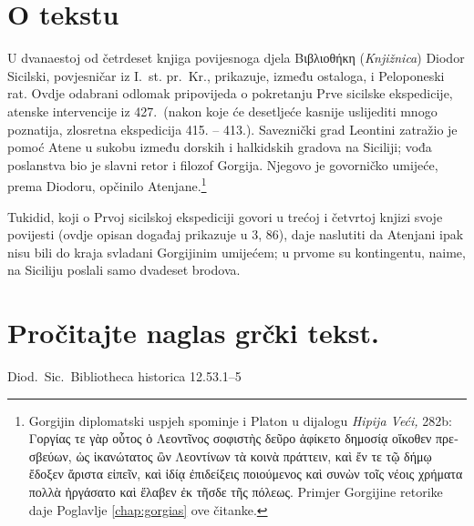 

\section*{O tekstu}

U dvanaestoj od četrdeset knjiga povijesnoga djela \textgreek{Βιβλιοθήκη} (\textit{Knjižnica}) Diodor Sicilski, povjesničar iz I.~st. pr.~Kr., prikazuje, između ostaloga, i Peloponeski rat. Ovdje odabrani odlomak pripovijeda o pokretanju Prve sicilske ekspedicije, atenske intervencije iz 427.\ (nakon koje će desetljeće kasnije uslijediti mnogo poznatija, zlosretna ekspedicija 415. – 413.). Saveznički grad Leontini zatražio je pomoć Atene u sukobu između dorskih i halkidskih gradova na Siciliji; vođa poslanstva bio je slavni retor i filozof Gorgija. Njegovo je govorničko umijeće, prema Diodoru, opčinilo Atenjane.\footnote{Gorgijin diplomatski uspjeh spominje i Platon u dijalogu \textit{Hipija Veći,} 282b: \textgreek{Γοργίας τε γὰρ οὗτος ὁ Λεοντῖνος σοφιστὴς δεῦρο ἀφίκετο δημοσίᾳ οἴκοθεν πρεσβεύων, ὡς ἱκανώτατος ὢν Λεοντίνων τὰ κοινὰ πράττειν, καὶ ἔν τε τῷ δήμῳ ἔδοξεν ἄριστα εἰπεῖν, καὶ ἰδίᾳ ἐπιδείξεις ποιούμενος καὶ συνὼν τοῖς νέοις χρήματα πολλὰ ἠργάσατο καὶ ἔλαβεν ἐκ τῆσδε τῆς πόλεως.} Primjer Gorgijine retorike daje Poglavlje \ref{chap:gorgias} ove čitanke.}

Tukidid, koji o Prvoj sicilskoj ekspediciji govori u trećoj i četvrtoj knjizi svoje povijesti (ovdje opisan događaj prikazuje u 3, 86), daje naslutiti da Atenjani ipak nisu bili do kraja svladani Gorgijinim umijećem; u prvome su kontingentu, naime, na Siciliju poslali samo dvadeset brodova.


\section*{Pročitajte naglas grčki tekst.}

Diod.~Sic.\ Bibliotheca historica 12.53.1–5


\medskip


